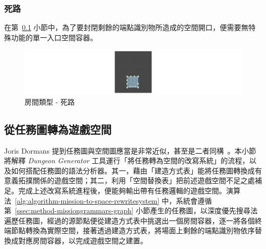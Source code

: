 \subsubsection{死路}
\label{sssec:method-spacepieces-types-wall}

在第~\ref{ssec:method-spacepieces-frommissiontospace} 小節中，為了要封閉剩餘的端點識別物所造成的空間開口，便需要無特殊功能的單一入口空間容器。

\begin{figure}[ht]
  \begin{center}
    \includegraphics[width=1.0\textwidth]{figures/roomtype-wall.png}
    \caption{房間類型 - 死路}
    \label{fig:roomtype-wall}
  \end{center}
\end{figure}

\subsection{從任務圖轉為遊戲空間}
\label{ssec:method-spacepieces-frommissiontospace}

Joris Dormans 提到任務圖與空間圖應當是非常近似，甚至是二者同構~\cite{dormans2010adventures}。本小節將解釋 \textit{Dungeon Generator} 工具運行「將任務轉為空間的改寫系統」的流程，以及如何搭配任務圖的語法分析器。其一，藉由「建造方式表」能將任務圖轉換成有意義拓撲關係的遊戲空間；其二，利用「空間替換表」把前述遊戲空間不足之處補足。完成上述改寫系統進程後，便能夠輸出帶有任務邏輯的遊戲空間。演算法~\ref{alg:algorithm-mission-to-space-rewritesystem} 中，系統會遵循第~\ref{ssec:method-missiongrammars-graph} 小節產生的任務圖，以深度優先搜尋法遍歷任務圖，經過的源節點便從建造方式表中挑選出一個房間容器，逐一將各個終端節點轉換為實際空間，接著透過建造方式表，將場面上剩餘的端點識別物依序替換成對應房間容器，以完成遊戲空間之建置。

